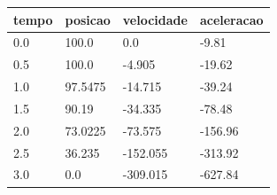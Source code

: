 \begin{tabular}{llll}
\toprule
tempo & posicao & velocidade & aceleracao \\
\midrule
0.0 & 100.0 & 0.0 & -9.81 \\
0.5 & 100.0 & -4.905 & -19.62 \\
1.0 & 97.5475 & -14.715 & -39.24 \\
1.5 & 90.19 & -34.335 & -78.48 \\
2.0 & 73.0225 & -73.575 & -156.96 \\
2.5 & 36.235 & -152.055 & -313.92 \\
3.0 & 0.0 & -309.015 & -627.84 \\
\bottomrule
\end{tabular}
